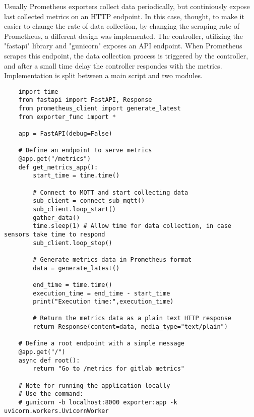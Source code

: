 Usually Prometheus exporters collect data periodically, but continiously expose last collected metrics on an HTTP endpoint. In this case, thought, to make it easier to change the rate of data collection, by changing the scraping rate of Prometheus, a different design was implemented. The controller, utilizing the "fastapi" library and "gunicorn" exposes an API endpoint. When Prometheus scrapes this endpoint, the data collection process is triggered by the controller, and after a small time delay the controller respondes with the metrics. Implementation is split between a main script and two modules.

\begin{verbatim}
    import time
    from fastapi import FastAPI, Response
    from prometheus_client import generate_latest
    from exporter_func import *

    app = FastAPI(debug=False)

    # Define an endpoint to serve metrics
    @app.get("/metrics")
    def get_metrics_app():
        start_time = time.time()
        
        # Connect to MQTT and start collecting data
        sub_client = connect_sub_mqtt()
        sub_client.loop_start()
        gather_data()
        time.sleep(1) # Allow time for data collection, in case sensors take time to respond
        sub_client.loop_stop()

        # Generate metrics data in Prometheus format
        data = generate_latest()

        end_time = time.time()
        execution_time = end_time - start_time
        print("Execution time:",execution_time)

        # Return the metrics data as a plain text HTTP response
        return Response(content=data, media_type="text/plain")

    # Define a root endpoint with a simple message
    @app.get("/")
    async def root():
        return "Go to /metrics for gitlab metrics"

    # Note for running the application locally
    # Use the command:
    # gunicorn -b localhost:8000 exporter:app -k uvicorn.workers.UvicornWorker
\end{verbatim}


